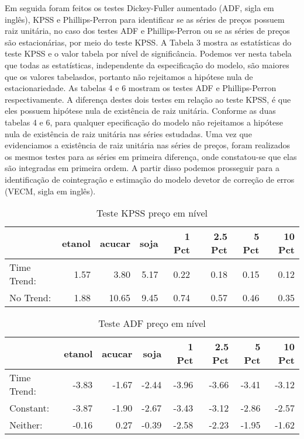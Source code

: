 \documentclass[]{article}
\begin{document}
Em seguida foram feitos os testes Dickey-Fuller aumentado (ADF, sigla em
inglês), KPSS e Phillips-Perron para identificar se as séries de preços
possuem raiz unitária, no caso dos testes ADF e Phillips-Perron ou se as
séries de preços são estacionárias, por meio do teste KPSS. A Tabela 3
mostra as estatísticas do teste KPSS e o valor tabela por nível de
significância. Podemos ver nesta tabela que todas as estatísticas,
independente da especificação do modelo, são maiores que os valores
tabelasdos, portanto não rejeitamos a hipótese nula de estacionariedade.
As tabelas 4 e 6 mostram os testes ADF e Phillips-Perron
respectivamente. A diferença destes dois testes em relação ao teste
KPSS, é que eles possuem hipótese nula de existência de raiz unitária.
Conforme as duas tabelas 4 e 6, para qualquer epecificação do modelo não
rejeitamos a hipótese nula de existência de raiz unitária nas séries
estudadas. Uma vez que evidenciamos a existência de raiz unitária nas
séries de preços, foram realizados os mesmos testes para as séries em
primeira diferença, onde constatou-se que elas são integradas em
primeira ordem. A partir disso podemos prosseguir para a identificação
de cointegração e estimação do modelo devetor de correção de erros
(VECM, sigla em inglês).

\begin{longtable}[t]{lrrrrrrr}
\caption{\label{tab:ADF e KPSS nivel}Teste KPSS preço em nível}\\
\toprule
  & etanol & acucar & soja & 1 Pct & 2.5 Pct & 5 Pct & 10 Pct\\
\midrule
Time Trend: & 1.57 & 3.80 & 5.17 & 0.22 & 0.18 & 0.15 & 0.12\\
No Trend: & 1.88 & 10.65 & 9.45 & 0.74 & 0.57 & 0.46 & 0.35\\
\bottomrule
\end{longtable}

\begin{longtable}[t]{lrrrrrrr}
\caption{\label{tab:ADF e KPSS nivel}Teste ADF preço em nível}\\
\toprule
  & etanol & acucar & soja & 1 Pct & 2.5 Pct & 5 Pct & 10 Pct\\
\midrule
Time Trend: & -3.83 & -1.67 & -2.44 & -3.96 & -3.66 & -3.41 & -3.12\\
Constant: & -3.87 & -1.90 & -2.67 & -3.43 & -3.12 & -2.86 & -2.57\\
Neither: & -0.16 & 0.27 & -0.39 & -2.58 & -2.23 & -1.95 & -1.62\\
\bottomrule
\end{longtable}
\end{document}
